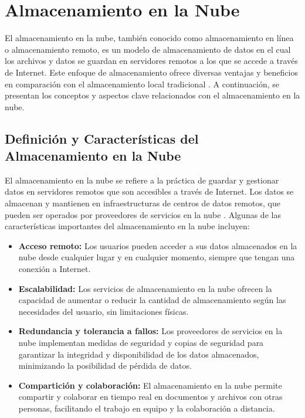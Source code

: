 \section{Almacenamiento en la Nube}

El almacenamiento en la nube, también conocido como almacenamiento en línea o almacenamiento remoto, es un modelo de almacenamiento de datos en el cual los archivos y datos se guardan en servidores remotos a los que se accede a través de Internet. Este enfoque de almacenamiento ofrece diversas ventajas y beneficios en comparación con el almacenamiento local tradicional \cite{69}. A continuación, se presentan los conceptos y aspectos clave relacionados con el almacenamiento
en la nube.

\subsection{Definición y Características del Almacenamiento en la Nube}
El almacenamiento en la nube se refiere a la práctica de guardar y gestionar datos en servidores remotos que son accesibles a través de Internet. Los datos se almacenan y mantienen en infraestructuras de centros de datos remotos, que pueden ser operados por proveedores de servicios en la nube \cite{70}. Algunas de las características importantes del almacenamiento en la nube incluyen:
\begin{itemize}
    \item \textbf{Acceso remoto:} Los usuarios pueden acceder a sus datos almacenados en la nube desde cualquier lugar y en cualquier momento, siempre que tengan una conexión a Internet.
    \item \textbf{Escalabilidad:} Los servicios de almacenamiento en la nube ofrecen la capacidad de aumentar o reducir la cantidad de almacenamiento según las necesidades del usuario, sin limitaciones físicas.
    \item \textbf{Redundancia y tolerancia a fallos:} Los proveedores de servicios en la nube implementan medidas de seguridad y copias de seguridad para garantizar la integridad y disponibilidad de los datos almacenados, minimizando la posibilidad de pérdida de datos.
    \item \textbf{Compartición y colaboración:} El almacenamiento en la nube permite compartir y colaborar en tiempo real en documentos y archivos con otras personas, facilitando el trabajo en equipo y la colaboración a distancia.
\end{itemize}

